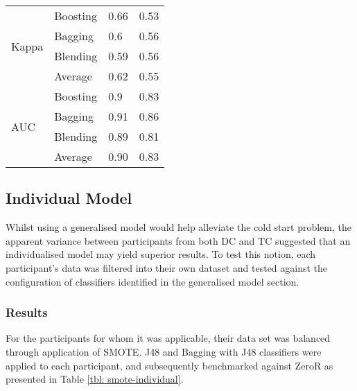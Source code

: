 \begin{table}[h]
\begin{tabular}{@{}llll@{}}
\multirow{4}{*}{Kappa}     & Boosting   & 0.66                & 0.53                  \\
                           & Bagging    & 0.6                 & 0.56                  \\
                           & Blending   & 0.59                & 0.56                  \\
                           & Average    & 0.62                & 0.55                  \\ \midrule
\multirow{4}{*}{AUC}       & Boosting   & 0.9                 & 0.83                  \\
                           & Bagging    & 0.91                & 0.86                  \\
                           & Blending   & 0.89                & 0.81                  \\
                           & Average    & 0.90                & 0.83                  \\ \bottomrule
\end{tabular}
\end{table}


\subsection{Individual Model}
Whilst using a generalised model would help alleviate the cold start problem, the apparent variance between participants from both DC and TC suggested that an individualised model may yield superior results. To test this notion, each participant's data was filtered into their own dataset and tested against the configuration of classifiers identified in the generalised model section.


\subsubsection{Results}
For the participants for whom it was applicable, their data set was balanced through application of SMOTE.  J48 and Bagging with J48 classifiers were applied to each participant, and subsequently benchmarked against ZeroR as presented in Table \ref{tbl: smote-individual}.

